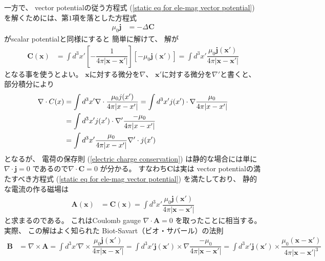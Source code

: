 一方で、
vector potentialの従う方程式
(\ref{static eq for ele-mag vector potential})
を解くためには、第$1$項を落とした方程式
\begin{align}
  \mu_0 \bm{j}
&=
  -
    \Delta
    \bm{C}
\end{align}
がscalar potentialと同様にすると
簡単に解けて、
解が
\begin{align}
  \bm{C} (\bm{x})
&=
  \int d^3 x'
  \left[
    - \dfrac{1}{
      4 \pi |\bm{x} - \bm{x}'|
    }
  \right]
  \left[
    - \mu_0
    \bm{j} (\bm{x}')
  \right]
=
  \int d^3 x'
    \dfrac{
      \mu_0 \bm{j} (\bm{x}')
    }{
      4 \pi
      |\bm{x} - \bm{x}'|
    }
\end{align}
となる事を使うとよい。
$\bm{x}$に対する微分を$\nabla$、
$\bm{x}'$に対する微分を$\nabla'$と書くと、
部分積分により
\begin{align}
  \nabla \cdot C(x)
&=
  \int d^3 x'
    \nabla \cdot
    \dfrac{
      \mu_0 j (x')
    }{
      4 \pi
      |x - x'|
    }
=
  \int d^3 x'
    j (x')
  \cdot
    \nabla
    \dfrac{ \mu_0 }{
      4 \pi
      |x - x'|
    }
\notag\\&
=
  \int d^3 x'
    j (x')
  \cdot
    \nabla'
    \dfrac{ -\mu_0 }{
      4 \pi
      |x - x'|
    }
\notag\\&
=
  \int d^3 x'
    \dfrac{ \mu_0 }{
      4 \pi
      |x - x'|
    }
    \nabla' \cdot j (x')
\end{align}
となるが、
電荷の保存則
(\ref{electric charge conservation})
は静的な場合には単に
$\nabla \cdot \bm{j} = 0$
であるので$\nabla \cdot \bm{C} = 0$
が分かる。
すなわち$\bm{C}$は実は
vector potentialの満たすべき方程式
(\ref{static eq for ele-mag vector potential})
を満たしており、
静的な電流の作る磁場は
\begin{align}
  \bm{A} (\bm{x})
&=
  \bm{C} (\bm{x})
=
  \int d^3 x'
    \dfrac{
      \mu_0 \bm{j} (\bm{x}')
    }{
      4 \pi
      |\bm{x} - \bm{x}'|
    }
\end{align}
と求まるのである。
これはCoulomb gauge
$\nabla \cdot\bm{A} = 0$
を取ったことに相当する。
実際、
この解はよく知られた
Biot-Savart（ビオ・サバール）の法則
\begin{align}
  \bm{B}
&=
  \nabla \times \bm{A}
=
  \int d^3 x'
  \nabla \times
    \dfrac{
      \mu_0 \bm{j} (\bm{x}')
    }{
      4 \pi
      |\bm{x} - \bm{x}'|
    }
=
  \int d^3 x'
  \bm{j} (\bm{x}') \times
  \nabla
    \dfrac{
      - \mu_0
    }{
      4 \pi
      |\bm{x} - \bm{x}'|
    }
=
  \int d^3 x'
  \bm{j} (\bm{x}') \times
    \dfrac{
      \mu_0
      (\bm{x} - \bm{x}')
    }{
      4 \pi
      |\bm{x} - \bm{x}'|^3
    }
\end{align}
